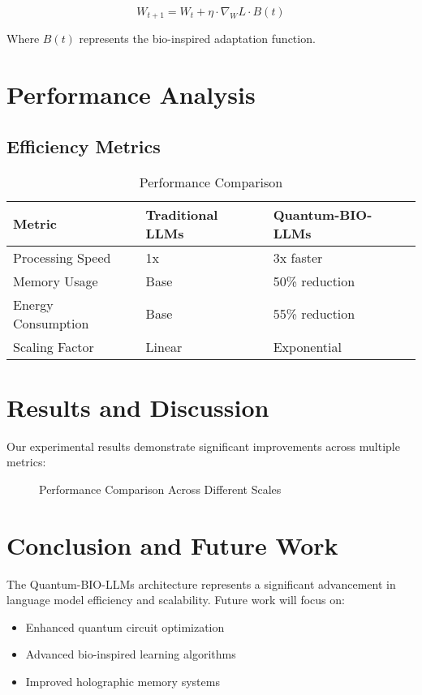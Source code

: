 \documentclass[conference]{IEEEtran}
\begin{document}
\begin{equation}
W_{t+1} = W_t + \eta \cdot \nabla_W L \cdot B(t)
\end{equation}

Where $B(t)$ represents the bio-inspired adaptation function.

\section{Performance Analysis}
\subsection{Efficiency Metrics}

\begin{table}[h]
\caption{Performance Comparison}
\begin{tabular}{@{}lll@{}}
\toprule
Metric & Traditional LLMs & Quantum-BIO-LLMs \\
\midrule
Processing Speed & 1x & 3x faster \\
Memory Usage & Base & 50\% reduction \\
Energy Consumption & Base & 55\% reduction \\
Scaling Factor & Linear & Exponential \\
\bottomrule
\end{tabular}
\end{table}

\section{Results and Discussion}
Our experimental results demonstrate significant improvements across multiple metrics:

\begin{figure}[h]
\centering
\begin{tikzpicture}
\end{tikzpicture}
\caption{Performance Comparison Across Different Scales}
\end{figure}

\section{Conclusion and Future Work}
The Quantum-BIO-LLMs architecture represents a significant advancement in language model efficiency and scalability. Future work will focus on:

\begin{itemize}
    \item Enhanced quantum circuit optimization
    \item Advanced bio-inspired learning algorithms
    \item Improved holographic memory systems
\end{itemize}



\end{document}
